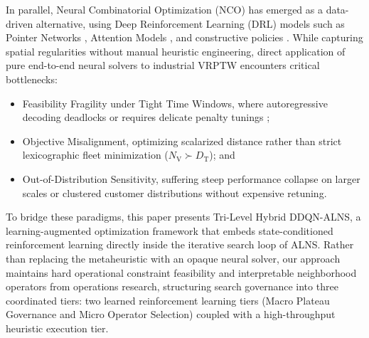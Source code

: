 \documentclass{ieeeaccess}
\newcommand{\NV}{{N_\mathrm{V}}}
\newcommand{\TD}{{D_\mathrm{T}}}
\begin{document}
In parallel, Neural Combinatorial Optimization (NCO) has emerged as a data-driven alternative, using Deep Reinforcement Learning (DRL) models such as Pointer Networks \cite{vinyals2015pointer}, Attention Models \cite{kool2019attention}, and constructive policies \cite{nazari2018reinforcement}. While capturing spatial regularities without manual heuristic engineering, direct application of pure end-to-end neural solvers to industrial VRPTW encounters critical bottlenecks:
\begin{itemize}
    \item[(i)] Feasibility Fragility under Tight Time Windows, where autoregressive decoding deadlocks or requires delicate penalty tunings \cite{falkner2020learning, lin2021deep};
    \item[(ii)] Objective Misalignment, optimizing scalarized distance rather than strict lexicographic fleet minimization ($\NV \succ \TD$); and
    \item[(iii)] Out-of-Distribution Sensitivity, suffering steep performance collapse on larger scales or clustered customer distributions without expensive retuning.
\end{itemize}

To bridge these paradigms, this paper presents Tri-Level Hybrid DDQN-ALNS, a learning-augmented optimization framework that embeds state-conditioned reinforcement learning directly inside the iterative search loop of ALNS. Rather than replacing the metaheuristic with an opaque neural solver, our approach maintains hard operational constraint feasibility and interpretable neighborhood operators from operations research, structuring search governance into three coordinated tiers: two learned reinforcement learning tiers (Macro Plateau Governance and Micro Operator Selection) coupled with a high-throughput heuristic execution tier. 
\end{document}
